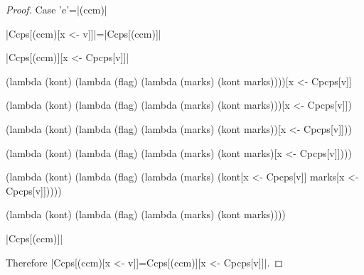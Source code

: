 \begin{proof}{Case \scheme'e'=\scheme|(ccm)|}

\scheme|Ccps[(ccm)[x <- v]]|=\scheme|Ccps[(ccm)]|

\scheme|Ccps[(ccm)][x <- Cpcps[v]]|

\begin{schemeblock}
\begin{schemedisplay}
(lambda (kont)
  (lambda (flag)
    (lambda (marks)
      (kont marks))))[x <- Cpcps[v]]
\end{schemedisplay}
\end{schemeblock}

\begin{schemeblock}
\begin{schemedisplay}
(lambda (kont)
  (lambda (flag)
    (lambda (marks)
      (kont marks)))[x <- Cpcps[v]])
\end{schemedisplay}
\end{schemeblock}

\begin{schemeblock}
\begin{schemedisplay}
(lambda (kont)
  (lambda (flag)
    (lambda (marks)
      (kont marks))[x <- Cpcps[v]]))
\end{schemedisplay}
\end{schemeblock}

\begin{schemeblock}
\begin{schemedisplay}
(lambda (kont)
  (lambda (flag)
    (lambda (marks)
      (kont marks)[x <- Cpcps[v]])))
\end{schemedisplay}
\end{schemeblock}

\begin{schemeblock}
\begin{schemedisplay}
(lambda (kont)
  (lambda (flag)
    (lambda (marks)
      (kont[x <- Cpcps[v]] marks[x <- Cpcps[v]]))))
\end{schemedisplay}
\end{schemeblock}

\begin{schemeblock}
\begin{schemedisplay}
(lambda (kont)
  (lambda (flag)
    (lambda (marks)
      (kont marks))))
\end{schemedisplay}
\end{schemeblock}

\noindent
\scheme|Ccps[(ccm)]|

Therefore \scheme|Ccps[(ccm)[x <- v]]=Ccps[(ccm)][x <- Cpcps[v]]|.
\end{proof}

